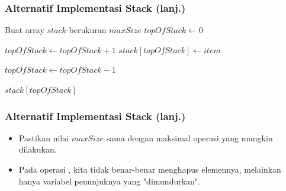 \begin{frame}
\frametitle{Alternatif Implementasi Stack (lanj.)}
\begin{codebox}
\li \Comment Buat array $stack$ berukuran $maxSize$
\li $topOfStack \gets 0$
\end{codebox}

\begin{codebox}
\li $topOfStack \gets topOfStack + 1$
\li $stack[topOfStack] \gets item$
\end{codebox}

\begin{codebox}
\li $topOfStack \gets topOfStack - 1$
\end{codebox}

\begin{codebox}
\li \Return $stack[topOfStack]$
\end{codebox}

\end{frame}

\begin{frame}
\frametitle{Alternatif Implementasi Stack (lanj.)}
\begin{itemize}
  \item Pastikan nilai $maxSize$ sama dengan maksimal operasi  yang mungkin dilakukan.
  \item Pada operasi , kita tidak benar-benar menghapus elemennya, melainkan hanya variabel penunjuknya yang "dimundurkan".
\end{itemize}
\end{frame}
%

